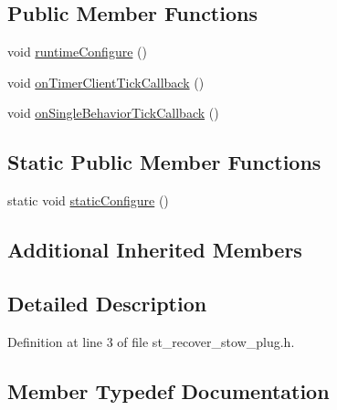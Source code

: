 \subsection*{Public Member Functions}
\begin{DoxyCompactItemize}
\item 
void \hyperlink{structsm__pr2__plugs_1_1StRecoverStowPlug_a5f2f825961ceda59ed4811aaca86bbcf}{runtime\+Configure} ()
\item 
void \hyperlink{structsm__pr2__plugs_1_1StRecoverStowPlug_adda940da8f2073a8bcf5ce4d06baccf2}{on\+Timer\+Client\+Tick\+Callback} ()
\item 
void \hyperlink{structsm__pr2__plugs_1_1StRecoverStowPlug_af118f0e9ead8955ef7152fb8f55474ab}{on\+Single\+Behavior\+Tick\+Callback} ()
\end{DoxyCompactItemize}
\subsection*{Static Public Member Functions}
\begin{DoxyCompactItemize}
\item 
static void \hyperlink{structsm__pr2__plugs_1_1StRecoverStowPlug_a8ac2f706967a6f32561d26dfa894ce04}{static\+Configure} ()
\end{DoxyCompactItemize}
\subsection*{Additional Inherited Members}


\subsection{Detailed Description}


Definition at line 3 of file st\+\_\+recover\+\_\+stow\+\_\+plug.\+h.



\subsection{Member Typedef Documentation}
\mbox{\label{structsm__pr2__plugs_1_1StRecoverStowPlug_a44331b5028d908b5a20054cc2ddb1972}} 
